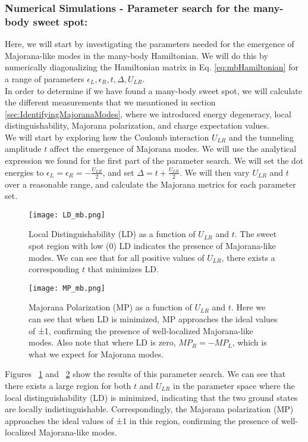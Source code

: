 \documentclass[11pt, letterpaper, titlepage]{article}
\begin{document}
\subsubsection{Numerical Simulations - Parameter search for the many-body sweet spot:}
Here, we will start by investigating the parameters needed for the emergence of Majorana-like modes in the many-body Hamiltonian. We will do this by numerically diagonalizing the Hamiltonian matrix in Eq. \ref{eq:mbHamiltonian} for a range of parameters $ϵ_L, ϵ_R, t, Δ, U_{LR}$.\\
In order to determine if we have found a many-body sweet spot, we will calculate the different measurements that we meantioned in section \ref{sec:IdentifyingMajoranaModes}, where we introduced energy degeneracy, local distinguishability, Majorana polarization, and charge expectation values.\\
We will start by exploring how the Coulomb interaction $U_{LR}$ and the tunneling amplitude $t$ affect the emergence of Majorana modes. We will use the analytical expression we found for the first part of the parameter search. We will set the dot energies to $ϵ_L = ϵ_R = -\frac{U_{LR}}{2}$, and set $Δ = t + \frac{U_{LR}}{2}$. We will then vary $U_{LR}$ and $t$ over a reasonable range, and calculate the Majorana metrics for each parameter set.\\
\begin{figure}[htbp]
  \centering
  \texttt{[image: LD\_mb.png]}
  \caption{Local Distinguishability (LD) as a function of $U_{LR}$ and $t$. The sweet spot region with low (0) LD indicates the presence of Majorana-like modes. We can see that for all positive values of $U_{LR}$, there exists a corresponding $t$ that minimizes LD.}
  \label{fig:mb_LD}
\end{figure}
\begin{figure}[htbp]
  \centering
  \texttt{[image: MP\_mb.png]}
  \caption{Majorana Polarization (MP) as a function of $U_{LR}$ and $t$. Here we can see that when LD is minimized, MP approaches the ideal values of ±1, confirming the presence of well-localized Majorana-like modes. Also note that where LD is zero, $MP_R=-MP_L$, which is what we expect for Majorana modes.}
  \label{fig:mb_MP}
\end{figure}
Figures ~\ref{fig:mb_LD} and ~\ref{fig:mb_MP} show the results of this parameter search. We can see that there exists a large region for both $t$ and $U_{LR}$ in the parameter space where the local distinguishability (LD) is minimized, indicating that the two ground states are locally indistinguishable. Correspondingly, the Majorana polarization (MP) approaches the ideal values of ±1 in this region, confirming the presence of well-localized Majorana-like modes.
\end{document}
